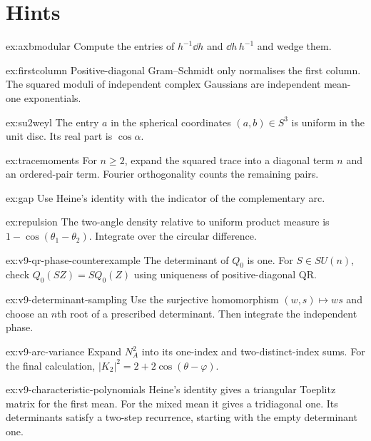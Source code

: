 \section{Hints}

\begin{hint}{ex:axbmodular}
Compute the entries of $h^{-1}\dd h$ and $\dd h\,h^{-1}$ and wedge them.
\end{hint}
\begin{hint}{ex:firstcolumn}
Positive-diagonal Gram--Schmidt only normalises the first column.
The squared moduli of independent complex Gaussians are independent
mean-one exponentials.
\end{hint}
\begin{hint}{ex:su2weyl}
The entry $a$ in the spherical coordinates $(a,b)\in S^3$ is uniform
in the unit disc. Its real part is $\cos\alpha$.
\end{hint}
\begin{hint}{ex:tracemoments}
For $n\ge2$, expand the squared trace into a diagonal term $n$ and an
ordered-pair term. Fourier orthogonality counts the remaining pairs.
\end{hint}
\begin{hint}{ex:gap}
Use Heine's identity with the indicator of the complementary arc.
\end{hint}
\begin{hint}{ex:repulsion}
The two-angle density relative to uniform product measure is
$1-\cos(\theta_1-\theta_2)$. Integrate over the circular difference.
\end{hint}

\begin{hint}{ex:v9-qr-phase-counterexample}
The determinant of $Q_0$ is one. For $S\in SU(n)$, check
$Q_0(SZ)=S Q_0(Z)$ using uniqueness of positive-diagonal QR.
\end{hint}
\begin{hint}{ex:v9-determinant-sampling}
Use the surjective homomorphism $(w,s)\mapsto ws$ and choose an $n$th
root of a prescribed determinant. Then integrate the independent phase.
\end{hint}
\begin{hint}{ex:v9-arc-variance}
Expand $N_A^2$ into its one-index and two-distinct-index sums.
For the final calculation, $|K_2|^2=2+2\cos(\theta-\varphi)$.
\end{hint}
\begin{hint}{ex:v9-characteristic-polynomials}
Heine's identity gives a triangular Toeplitz matrix for the first mean.
For the mixed mean it gives a tridiagonal one. Its determinants satisfy
a two-step recurrence, starting with the empty determinant one.
\end{hint}


